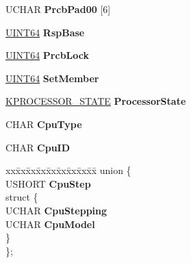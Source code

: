 \begin{DoxyCompactItemize}
U\+C\+H\+AR {\bfseries Prcb\+Pad00} \mbox{[}6\mbox{]}
\item 
\mbox{\label{struct___k_p_r_c_b_a4e0e923f1d244910a177bf126a9c8fb5}} 
\hyperlink{_processor_bind_8h_a57be03562867144161c1bfee95ca8f7c}{U\+I\+N\+T64} {\bfseries Rsp\+Base}
\item 
\mbox{\label{struct___k_p_r_c_b_a1ed2c54cab3f926df53a5b8d537ab85b}} 
\hyperlink{_processor_bind_8h_a57be03562867144161c1bfee95ca8f7c}{U\+I\+N\+T64} {\bfseries Prcb\+Lock}
\item 
\mbox{\label{struct___k_p_r_c_b_a246e4b1b1e5f8b80738bf63335074720}} 
\hyperlink{_processor_bind_8h_a57be03562867144161c1bfee95ca8f7c}{U\+I\+N\+T64} {\bfseries Set\+Member}
\item 
\mbox{\label{struct___k_p_r_c_b_adef9603b8be9acdb1c78f21379c51b34}} 
\hyperlink{struct___k_p_r_o_c_e_s_s_o_r___s_t_a_t_e}{K\+P\+R\+O\+C\+E\+S\+S\+O\+R\+\_\+\+S\+T\+A\+TE} {\bfseries Processor\+State}
\item 
\mbox{\label{struct___k_p_r_c_b_a3b3a5082c1750dd8ae480d64a1987830}} 
C\+H\+AR {\bfseries Cpu\+Type}
\item 
\mbox{\label{struct___k_p_r_c_b_ad1a46fbe70a10b8276714fce937f6ae5}} 
C\+H\+AR {\bfseries Cpu\+ID}
\item 
\mbox{\label{struct___k_p_r_c_b_a8d825e868b6a3f57bd69fe377a5efbe4}} 
\begin{tabbing}
xx\=xx\=xx\=xx\=xx\=xx\=xx\=xx\=xx\=\kill
union \{\\
\>USHORT {\bfseries CpuStep}\\
\mbox{\label{union___k_p_r_c_b_1_1_0D1923_a6859ecae23bd188e5c75f6f88cf17a96}} 
\>struct \{\\
\>\>UCHAR {\bfseries CpuStepping}\\
\>\>UCHAR {\bfseries CpuModel}\\
\>\} \\
\}; \\


\end{tabbing}
\end{DoxyCompactItemize}
